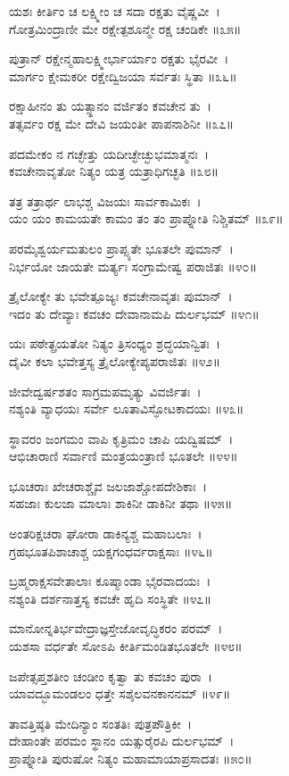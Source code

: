 ಯಶಃ ಕೀರ್ತಿಂ ಚ ಲಕ್ಷ್ಮೀಂ ಚ ಸದಾ ರಕ್ಷತು ವೈಷ್ಣವೀ~।\\
ಗೋತ್ರಮಿಂದ್ರಾಣೀ ಮೇ ರಕ್ಷೇತ್ಪಶೂನ್ಮೇ ರಕ್ಷ ಚಂಡಿಕೇ ॥೩೫॥

ಪುತ್ರಾನ್ ರಕ್ಷೇನ್ಮಹಾಲಕ್ಷ್ಮೀರ್ಭಾರ್ಯಾಂ ರಕ್ಷತು ಭೈರವೀ~।\\
ಮಾರ್ಗಂ ಕ್ಷೇಮಕರೀ ರಕ್ಷೇದ್ವಿಜಯಾ ಸರ್ವತಃ ಸ್ಥಿತಾ ॥೩೬॥

ರಕ್ಷಾಹೀನಂ ತು ಯತ್ಸ್ಥಾನಂ ವರ್ಜಿತಂ ಕವಚೇನ ತು~।\\
ತತ್ಸರ್ವಂ ರಕ್ಷ ಮೇ ದೇವಿ ಜಯಂತೀ ಪಾಪನಾಶಿನೀ ॥೩೭॥

ಪದಮೇಕಂ ನ ಗಚ್ಛೇತ್ತು ಯದೀಚ್ಛೇಚ್ಛುಭಮಾತ್ಮನಃ~।\\
ಕವಚೇನಾವೃತೋ ನಿತ್ಯಂ ಯತ್ರ ಯತ್ರಾಧಿಗಚ್ಛತಿ ॥೩೮॥

ತತ್ರ ತತ್ರಾರ್ಥ ಲಾಭಶ್ಚ ವಿಜಯಃ ಸಾರ್ವಕಾಮಿಕಃ~।\\
ಯಂ ಯಂ ಕಾಮಯತೇ ಕಾಮಂ ತಂ ತಂ ಪ್ರಾಪ್ನೋತಿ ನಿಶ್ಚಿತಮ್ ॥೩೯॥

ಪರಮೈಶ್ವರ್ಯಮತುಲಂ ಪ್ರಾಪ್ಸ್ಯತೇ ಭೂತಲೇ ಪುಮಾನ್~।\\
ನಿರ್ಭಯೋ ಜಾಯತೇ ಮರ್ತ್ಯಃ ಸಂಗ್ರಾಮೇಷ್ವ ಪರಾಜಿತಃ ॥೪೦॥

ತ್ರೈಲೋಕ್ಯೇ ತು ಭವೇತ್ಪೂಜ್ಯಃ ಕವಚೇನಾವೃತಃ ಪುಮಾನ್~।\\
ಇದಂ ತು ದೇವ್ಯಾಃ ಕವಚಂ ದೇವಾನಾಮಪಿ ದುರ್ಲಭಮ್ ॥೪೧॥

ಯಃ ಪಠೇತ್ಪ್ರಯತೋ ನಿತ್ಯಂ ತ್ರಿಸಂಧ್ಯಂ ಶ್ರದ್ಧಯಾನ್ವಿತಃ~।\\
ದೈವೀ ಕಲಾ ಭವೇತ್ತಸ್ಯ ತ್ರೈಲೋಕ್ಯೇಪ್ಯಪರಾಜಿತಃ ॥೪೨॥

ಜೀವೇದ್ವರ್ಷಶತಂ ಸಾಗ್ರಮಪಮೃತ್ಯು ವಿವರ್ಜಿತಃ~।\\
ನಶ್ಯಂತಿ ವ್ಯಾಧಯಃ ಸರ್ವೇ ಲೂತಾವಿಸ್ಫೋಟಕಾದಯಃ ॥೪೩॥

ಸ್ಥಾವರಂ ಜಂಗಮಂ ವಾಪಿ ಕೃತ್ರಿಮಂ ಚಾಪಿ ಯದ್ವಿಷಮ್~।\\
ಆಭಿಚಾರಾಣಿ ಸರ್ವಾಣಿ ಮಂತ್ರಯಂತ್ರಾಣಿ ಭೂತಲೇ ॥೪೪॥

ಭೂಚರಾಃ ಖೇಚರಾಶ್ಚೈವ ಜಲಜಾಶ್ಚೋಪದೇಶಿಕಾಃ~।\\
ಸಹಜಾಃ ಕುಲಜಾ ಮಾಲಾಃ ಶಾಕಿನೀ ಡಾಕಿನೀ ತಥಾ ॥೪೫॥

ಅಂತರಿಕ್ಷಚರಾ ಘೋರಾ ಡಾಕಿನ್ಯಶ್ಚ ಮಹಾಬಲಾಃ~।\\
ಗ್ರಹಭೂತಪಿಶಾಚಾಶ್ಚ ಯಕ್ಷಗಂಧರ್ವರಾಕ್ಷಸಾಃ ॥೪೬॥

ಬ್ರಹ್ಮರಾಕ್ಷಸವೇತಾಲಾಃ ಕೂಷ್ಮಾಂಡಾ ಭೈರವಾದಯಃ~।\\
ನಶ್ಯಂತಿ ದರ್ಶನಾತ್ತಸ್ಯ ಕವಚೇ ಹೃದಿ ಸಂಸ್ಥಿತೇ ॥೪೭॥

ಮಾನೋನ್ನತಿರ್ಭವೇದ್ರಾಜ್ಞಸ್ತೇಜೋವೃದ್ಧಿಕರಂ ಪರಮ್~।\\
ಯಶಸಾ ವರ್ಧತೇ ಸೋಽಪಿ ಕೀರ್ತಿಮಂಡಿತಭೂತಲೇ ॥೪೮॥

ಜಪೇತ್ಸಪ್ತಶತೀಂ ಚಂಡೀಂ ಕೃತ್ವಾ ತು ಕವಚಂ ಪುರಾ~।\\
ಯಾವದ್ಭೂಮಂಡಲಂ ಧತ್ತೇ ಸಶೈಲವನಕಾನನಮ್ ॥೪೯॥

ತಾವತ್ತಿಷ್ಠತಿ ಮೇದಿನ್ಯಾಂ ಸಂತತಿಃ ಪುತ್ರಪೌತ್ರಿಕೀ~।\\
ದೇಹಾಂತೇ ಪರಮಂ ಸ್ಥಾನಂ ಯತ್ಸುರೈರಪಿ ದುರ್ಲಭಮ್~।\\
ಪ್ರಾಪ್ನೋತಿ ಪುರುಷೋ ನಿತ್ಯಂ ಮಹಾಮಾಯಾಪ್ರಸಾದತಃ ॥೫೦॥
